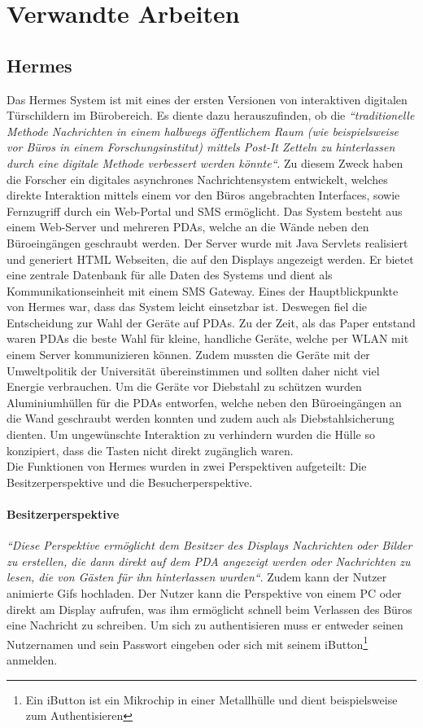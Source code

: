\chapter{Verwandte Arbeiten}
\section{Hermes}
Das Hermes System\cite{cheverest:2003:paper}\cite{cheverest:2003:article}\cite{cheveres:2005:hermes-bluetooth}\cite{cheverest:2012} ist mit eines der ersten Versionen von interaktiven digitalen Türschildern im Bürobereich.
Es diente dazu herauszufinden, ob die \textit{``traditionelle Methode Nachrichten in einem halbwegs öffentlichem Raum (wie beispielsweise vor Büros in einem Forschungsinstitut) mittels Post-It Zetteln zu hinterlassen durch eine digitale Methode verbessert werden könnte``}\cite{cheverest:2003:paper}.
Zu diesem Zweck haben die Forscher ein digitales asynchrones Nachrichtensystem entwickelt, welches direkte Interaktion mittels einem vor den Büros angebrachten Interfaces, sowie Fernzugriff durch ein Web-Portal und SMS ermöglicht.
Das System besteht aus einem Web-Server und mehreren PDAs, welche an die Wände neben den Büroeingängen geschraubt werden.
Der Server wurde mit Java Servlets realisiert und generiert HTML Webseiten, die auf den Displays angezeigt werden. Er bietet eine zentrale Datenbank für alle Daten des Systems und dient als Kommunikationseinheit mit einem SMS Gateway.
Eines der Hauptblickpunkte von Hermes war, dass das System leicht einsetzbar ist. Deswegen fiel die Entscheidung zur Wahl der Geräte auf PDAs. Zu der Zeit, als das Paper entstand waren PDAs die beste Wahl für kleine, handliche Geräte, welche per WLAN mit einem Server kommunizieren können. Zudem mussten die Geräte mit der Umweltpolitik der Universität übereinstimmen und sollten daher nicht viel Energie verbrauchen.
Um die Geräte vor Diebstahl zu schützen wurden Aluminiumhüllen für die PDAs entworfen, welche neben den Büroeingängen an die Wand geschraubt werden konnten und zudem auch als Diebstahlsicherung dienten. Um ungewünschte Interaktion zu verhindern wurden die Hülle so konzipiert, dass die Tasten nicht direkt zugänglich waren.\\

Die Funktionen von Hermes wurden in zwei Perspektiven aufgeteilt: Die Besitzerperspektive und die Besucherperspektive.
\subsubsection{Besitzerperspektive}
\textit{``Diese Perspektive ermöglicht dem Besitzer des Displays Nachrichten oder Bilder zu erstellen, die dann direkt auf dem PDA angezeigt werden oder Nachrichten zu lesen, die von Gästen für ihn hinterlassen wurden``}\cite{cheverest:2003:paper}. Zudem kann der Nutzer animierte Gifs hochladen.
Der Nutzer kann die Perspektive von einem PC oder direkt am Display aufrufen, was ihm ermöglicht schnell beim Verlassen des Büros eine Nachricht zu schreiben. Um sich zu authentisieren muss er entweder seinen Nutzernamen und sein Passwort eingeben oder sich mit seinem iButton\footnote{Ein iButton ist ein Mikrochip in einer Metallhülle und dient beispielsweise zum Authentisieren\cite{iButton:website}} anmelden.
